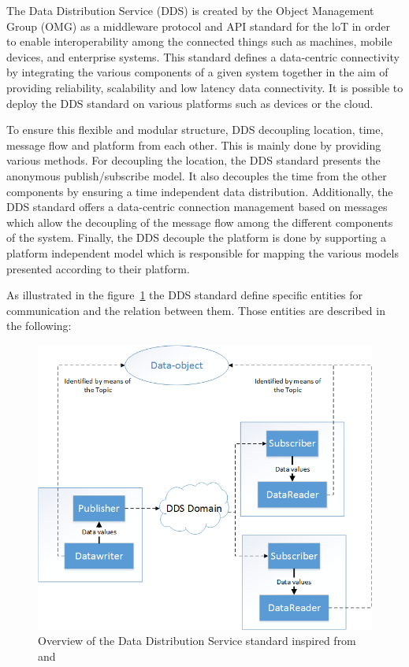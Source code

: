 The Data Distribution Service (DDS) is created by the Object Management Group (OMG) as a middleware protocol and API standard for the loT in order to enable interoperability among the connected things such as machines, mobile devices, and enterprise systems. This standard defines a data-centric connectivity by integrating the various components of a given system together in the aim of providing reliability, scalability and low latency data connectivity. It is possible to deploy the DDS standard on various platforms such as devices or the cloud. \par 
To ensure this flexible and modular structure, DDS decoupling location, time, message flow and platform from each other. This is mainly done by providing various methods. For decoupling the location, the DDS standard presents the anonymous publish/subscribe model. It also decouples the time from the other components by ensuring a time independent data distribution. Additionally, the DDS standard offers a data-centric connection management based on messages which allow the decoupling of the message flow among the different components of the system\cite{ssd2}. Finally, the DDS decouple the platform is done by supporting a platform independent model which is responsible for mapping the various models presented according to their platform. \par 
As illustrated in the figure~\ref{fig:contrib2:dds} the DDS standard define specific entities for communication and the relation between them. Those entities are described in the following:
\begin{figure}[htbp]
    \centering
    \includegraphics[width=.9\textwidth]{resources/images/dds}
    \caption{Overview of the Data Distribution Service standard inspired from~\cite{ssd} and~\cite{ssd3}}\label{fig:contrib2:dds}
\end{figure}
